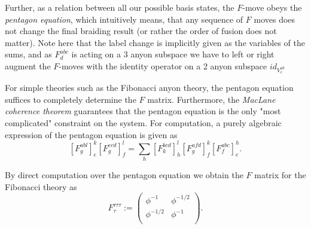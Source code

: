 \documentclass{article}
\begin{document}
Further, as a relation between all our possible basis states, the $F$-move obeys the {\it pentagon equation}, which intuitively means, that any sequence of $F$ moves does not change the final braiding result (or rather the order of fusion does not matter). Note here that the label change is implicitly given as the variables of the sums, and as $F^{abc}_{d}$ is acting on a 3 anyon subspace we have to left or right augment the $F$-moves with the identity operator on a 2 anyon subspace $id_{V^{ab}_{c}}$ 
\begin{center}
\label{grp:pentagon}
\end{center}

For simple theories such as the Fibonacci anyon theory, the pentagon equation suffices to completely determine the $F$ matrix. Furthermore, the {\it MacLane coherence theorem} \cite{mac_lane_categories_1978} guarantees that the pentagon equation is the only "most complicated" constraint on the system. For computation, a purely algebraic expression of the pentagon equation is given as
\[
   \left[ F^{abl}_{g} \right]_{e}^{k} \left[ F^{ecd}_{g} \right]_{f}^{l} = \sum_{h} \left[ F^{bcd}_{k} \right]_{h}^{l} \left[ F^{afd}_{g} \right]_{f}^{k} \left[ F^{abc}_{f} \right]_{e}^{h}.
\]

By direct computation over the pentagon equation we obtain the $F$ matrix for the Fibonacci theory as 
\[
  F^{\tau\tau\tau}_{\tau} := \begin{pmatrix}
    \phi^{-1}  & \phi^{-1 / 2}  \\
    \phi^{-1 / 2} & \phi^{-1}  \\
  \end{pmatrix}.
\]
\end{document}
